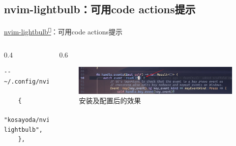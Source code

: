 \documentclass[aspectratio=169]{ctexbeamer}
\newcommand{\nerd}[1]{\texttt{#1}}
\newcommand{\link}[3][]{\href{#3}{#2\textsuperscript{\nerd{}}}}
\begin{document}
\subsection{nvim-lightbulb：可用code actions提示}
\begin{frame}[fragile]{\link{nvim-lightbulb}{https://github.com/kosayoda/nvim-lightbulb}：可用code actions提示}
  \begin{columns}
    \begin{column}{0.4\linewidth}
        \begin{lstlisting}[basicstyle=\tiny\ttfamily]
    -- ~/.config/nvim/lua/plugins/ui.lua

    {
      "kosayoda/nvim-lightbulb",
    },
        \end{lstlisting}
    \end{column}

    \begin{column}{0.6\linewidth}
      \begin{figure}[H]
        \centering
        \includegraphics[width=\linewidth]{./Figures/Lightbulb_Finish.jpg}
        \caption{安装及配置后的效果}%
      \end{figure}
    \end{column}
  \end{columns}
\end{frame}
\end{document}
